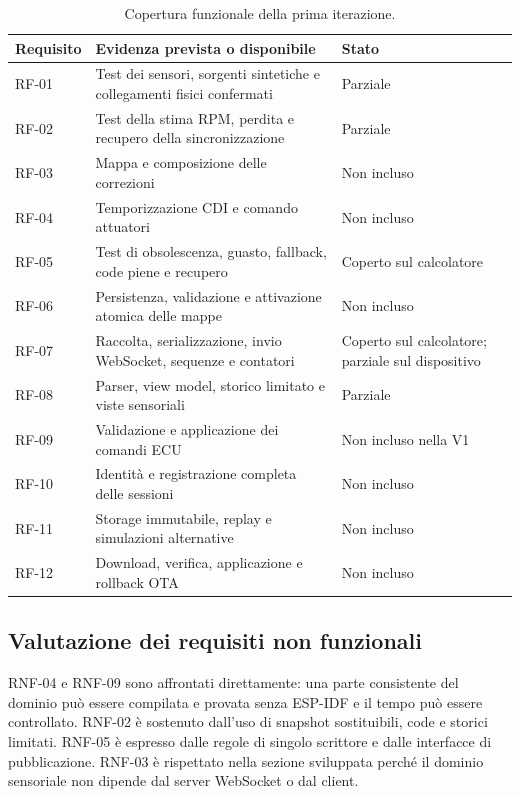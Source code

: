 \documentclass{article}
\begin{document}
\begin{table}[h]
\centering
\small
\begin{tabular}{p{} p{} p{}}
\hline
\textbf{Requisito} & \textbf{Evidenza prevista o disponibile} & \textbf{Stato} \\
\hline
RF-01 & Test dei sensori, sorgenti sintetiche e collegamenti fisici confermati & Parziale \\
RF-02 & Test della stima RPM, perdita e recupero della sincronizzazione & Parziale \\
RF-03 & Mappa e composizione delle correzioni & Non incluso \\
RF-04 & Temporizzazione CDI e comando attuatori & Non incluso \\
RF-05 & Test di obsolescenza, guasto, fallback, code piene e recupero & Coperto sul calcolatore \\
RF-06 & Persistenza, validazione e attivazione atomica delle mappe & Non incluso \\
RF-07 & Raccolta, serializzazione, invio WebSocket, sequenze e contatori & Coperto sul calcolatore; parziale sul dispositivo \\
RF-08 & Parser, view model, storico limitato e viste sensoriali & Parziale \\
RF-09 & Validazione e applicazione dei comandi ECU & Non incluso nella V1 \\
RF-10 & Identità e registrazione completa delle sessioni & Non incluso \\
RF-11 & Storage immutabile, replay e simulazioni alternative & Non incluso \\
RF-12 & Download, verifica, applicazione e rollback OTA & Non incluso \\
\hline
\end{tabular}
\caption{Copertura funzionale della prima iterazione.}
\label{tab:copertura}
\end{table}

\subsection{Valutazione dei requisiti non funzionali}

RNF-04 e RNF-09 sono affrontati direttamente: una parte consistente del dominio
può essere compilata e provata senza ESP-IDF e il tempo può essere controllato.
RNF-02 è sostenuto dall'uso di snapshot sostituibili, code e storici limitati.
RNF-05 è espresso dalle regole di singolo scrittore e dalle interfacce di
pubblicazione. RNF-03 è rispettato nella sezione sviluppata perché il dominio
sensoriale non dipende dal server WebSocket o dal client.
\end{document}
